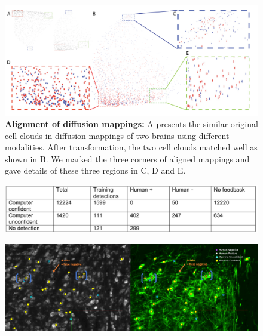 \documentclass[runningheads]{llncs}
\begin{document}
\begin{figure}[t]
  \includegraphics[width=\textwidth]{figures/Diffusionmap.png}
  \caption{{\bf Alignment of diffusion mappings:}  A  presents the similar original cell clouds in diffusion mappings of two brains using different modalities. After transformation, the two cell clouds matched well as shown in B. We marked the three corners of aligned mappings and gave details of these three regions in C, D and E.
}
\end{figure}

\begin{figure}[t]
  \includegraphics[width=\textwidth]{figures/MarkedCellsDetectionNumbers.png}
\end{figure}

\begin{figure}[t]
  \includegraphics[width=\textwidth]{figures/Marked_cell_detections.png}
  \caption{}
\end{figure}
\end{document}
